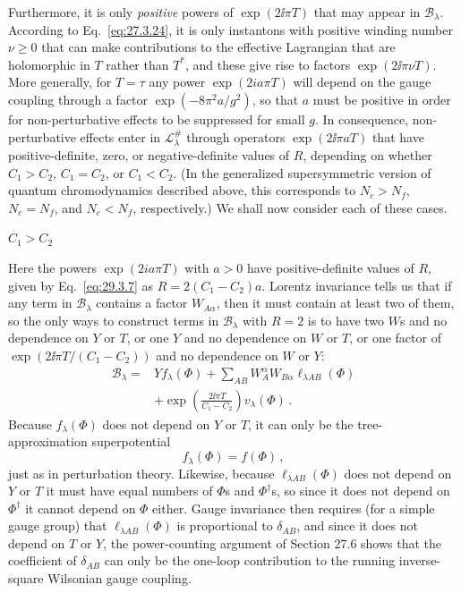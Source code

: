 Furthermore, it is only \emph{positive} powers of \(\exp(2\ii\pi T)\) that
may appear in \(\mathcal{B}_\lambda\). According to
Eq.~\eqref{eq:27.3.24}, it is only instantons with positive winding number
\(\nu\geq0\) that can make contributions to the effective Lagrangian that
are holomorphic in \(T\) rather than \(T^*\), and these give rise to
factors \(\exp(2\ii\pi\nu T)\). More generally, for \(T=\tau\) any power
\(\exp(2ia\pi T)\) will depend on the gauge coupling through a factor
\(\exp(-8\pi^2a/g^2)\), so that \(a\) must be positive in order for
non-perturbative effects to be suppressed for small \(g\). In consequence,
non-perturbative effects enter in \(\mathcal{L}^{\#}_\lambda\) through
operators \(\exp(2\ii\pi aT)\) that have positive-definite, zero, or
negative-definite values of \(R\), depending on whether \(C_1>C_2\),
\(C_1=C_2\), or \(C_1<C_2\). (In the generalized supersymmetric version
of quantum chromodynamics described above, this corresponds to \(N_c>N_f\),
\(N_c=N_f\), and \(N_c<N_f\), respectively.) We shall now consider each
of these cases.

\begin{center}
  \(C_1>C_2\)
\end{center}

Here the powers \(\exp(2ia\pi T)\) with \(a>0\) have positive-definite
values of \(R\), given by Eq.~\eqref{eq:29.3.7} as
\(R=2(C_1-C_2)a\). Lorentz invariance tells us that if any term in
\(\mathcal{B}_\lambda\) contains a factor \(W_{A\alpha}\), then it must
contain at least two of them, so the only ways to construct terms in
\(\mathcal{B}_\lambda\) with \(R=2\) is to have two \(W\)s and no
dependence on \(Y\) or \(T\), or one \(Y\) and no dependence on \(W\) or
\(T\), or one factor of \(\exp(2\ii\pi T/(C_1-C_2))\) and no dependence
on \(W\) or \(Y\):
\begin{equation}
  \begin{aligned}
  \mathcal{B}_\lambda
  ={}&
  Yf_\lambda(\Phi)
  +\sum_{AB}W_A^\alpha W_{B\alpha}
  \ell_{\lambda AB}(\Phi)
  \\
  &+\exp\left(\frac{2\ii\pi T}{C_1-C_2}\right)v_\lambda(\Phi)\,.
  \end{aligned}
  \tag{29.3.9}\label{eq:29.3.9}
\end{equation}
Because \(f_\lambda(\Phi)\) does not depend on \(Y\) or \(T\), it can only
be the tree-approximation superpotential
\begin{equation}
  f_\lambda(\Phi)=f(\Phi)\,,
  \tag{29.3.10}\label{eq:29.3.10}
\end{equation}
just as in perturbation theory. Likewise, because
\(\ell_{\lambda AB}(\Phi)\) does not depend on \(Y\) or \(T\) it must
have equal numbers of \(\Phi\)s and \(\Phi^\dagger\)s, so since it does
not depend on \(\Phi^\dagger\) it cannot depend on \(\Phi\) either. Gauge
invariance then requires (for a simple gauge group) that
\(\ell_{\lambda AB}(\Phi)\) is proportional to \(\delta_{AB}\), and since
it does not depend on \(T\) or \(Y\), the power-counting argument of
Section 27.6 shows that the coefficient of \(\delta_{AB}\) can only be the
one-loop contribution to the running inverse-square Wilsonian gauge
coupling.

